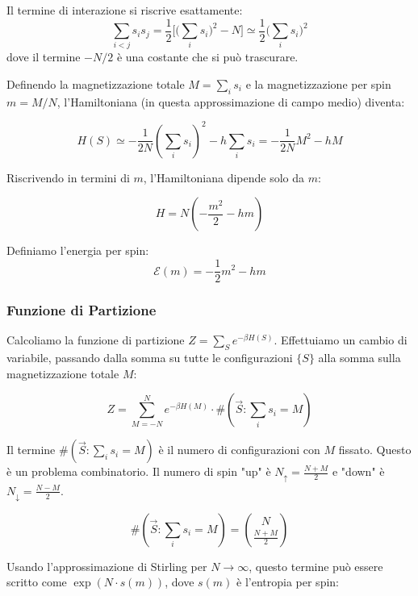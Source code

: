 Il termine di interazione si riscrive esattamente:
\begin{equation*}
   \sum_{i<j} s_i s_j = \frac{1}{2} \Big[ \big(\sum_i s_i\big)^2 - N \Big] \simeq \frac{1}{2} \big(\sum_i s_i\big)^2
\end{equation*}
dove il termine $-N/2$ è una costante che si può trascurare.

\noindent Definendo la magnetizzazione totale $M = \sum_i s_i$ e la magnetizzazione per spin $m = M/N$, l'Hamiltoniana (in questa approssimazione di campo medio) diventa:

\begin{equation}
H(S) \simeq -\frac{1}{2N} (\sum_i s_i)^2 - h \sum_i s_i = -\frac{1}{2N} M^2 - hM
\end{equation}

\noindent Riscrivendo in termini di $m$, l'Hamiltoniana dipende solo da $m$:

\begin{equation}
H = N \left( -\frac{m^2}{2} - hm \right)
\end{equation}


\noindent Definiamo l'energia per spin:
\begin{equation}
   \mathcal{E}(m) = -\frac{1}{2}m^2 - hm
\end{equation}

\subsubsection*{Funzione di Partizione}

Calcoliamo la funzione di partizione $Z = \sum_S e^{-\beta H(S)}$. Effettuiamo un cambio di variabile, passando dalla somma su tutte le configurazioni $\{S\}$ alla somma sulla magnetizzazione totale $M$:

\begin{equation}
Z = \sum_{M=-N}^N e^{-\beta H(M)} \cdot \#(\vec{S} : \sum_i s_i = M)
\end{equation}


Il termine $\#(\vec{S} : \sum_i s_i = M)$ è il numero di configurazioni con $M$ fissato. Questo è un problema combinatorio. Il numero di spin "up" è $N_{\uparrow} = \frac{N+M}{2}$ e "down" è $N_{\downarrow} = \frac{N-M}{2}$.

\begin{equation}
\#(\vec{S} : \sum_i s_i = M) = \binom{N}{\frac{N+M}{2}}
\end{equation}


Usando l'approssimazione di Stirling per $N \to \infty$, questo termine può essere scritto come $\exp(N \cdot s(m))$, dove $s(m)$ è l'entropia per spin:




